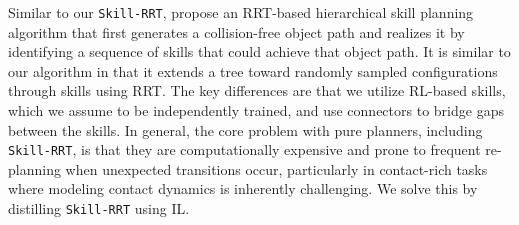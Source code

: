 Similar to our \texttt{Skill-RRT}, \citet{barry2013hierarchical} propose an RRT-based hierarchical skill planning algorithm that first generates a collision-free object path and realizes it by identifying a sequence of skills that could achieve that object path. It is similar to our algorithm in that it extends a tree toward randomly sampled configurations through skills using RRT. The key differences are that we utilize RL-based skills, which we assume to be independently trained, and use connectors to bridge gaps between the skills. In general, the core problem with pure planners, including \texttt{Skill-RRT}, is that they are computationally expensive and prone to frequent re-planning when unexpected transitions occur, particularly in contact-rich tasks where modeling contact dynamics is inherently challenging. We solve this by distilling \texttt{Skill-RRT} using IL.





